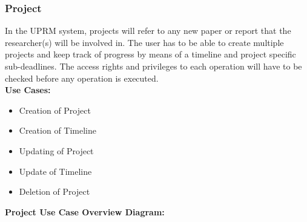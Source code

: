 \subsubsection{Project}
	In the UPRM system, projects will refer to any new paper or report that the researcher(s) will be involved in. The user has to be able to create multiple projects and keep track of progress by means of a timeline and project specific sub-deadlines.
	The access rights and privileges to each operation will have to be checked before any operation is executed.\\
	\textbf{Use Cases:}
	\begin{itemize}
		\item Creation of Project
		\item Creation of Timeline
		\item Updating of Project
		\item Update of Timeline
		\item Deletion of Project
	\end{itemize}
	\textbf{Project Use Case Overview Diagram:}\\
	\centerline{}		
	